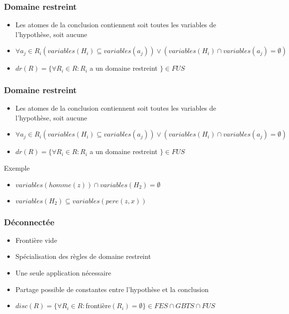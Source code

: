 \begin{frame}
	\frametitle{Domaine restreint}
	\begin{itemize}
		\item Les atomes de la conclusion contiennent soit toutes les variables de
		l'hypothèse, soit aucune
		\item $\forall a_j \in R_i (variables(H_i) \subseteq variables(a_j)) \vee 
		(variables(H_i) \cap variables(a_j) = \emptyset)$
		\item $dr(R) = \{\forall R_i \in R : R_i$ a un domaine restreint $\} \in FUS$
	\end{itemize}
	\vspace{10mm}
\end{frame}

\begin{frame}
	\frametitle{Domaine restreint}
	\begin{itemize}
		\item Les atomes de la conclusion contiennent soit toutes les variables de
		l'hypothèse, soit aucune
		\item $\forall a_j \in R_i (variables(H_i) \subseteq variables(a_j)) \vee 
		(variables(H_i) \cap variables(a_j) = \emptyset)$
		\item $dr(R) = \{\forall R_i \in R : R_i$ a un domaine restreint $\} \in FUS$
	\end{itemize}
	\vspace{10mm}
	\begin{exampleblock}{Exemple}
		\begin{itemize}
			\item $variables(homme(z)) \cap variables(H_2) = \emptyset$
			\item $variables(H_2) \subseteq variables(pere(z,x))$
		\end{itemize}
	\end{exampleblock}
\end{frame}

\begin{frame}
	\frametitle{Déconnectée}
	\begin{itemize}
		\item Frontière vide
		\item Spécialisation des règles de domaine restreint
		\item Une seule application nécessaire
		\item Partage possible de constantes entre l'hypothèse et la conclusion
		\item $disc(R) = \{\forall R_i \in R : $frontière$(R_i) = \emptyset \} \in FES \cap GBTS \cap FUS$
	\end{itemize}
	\vspace{10mm}
\end{frame}

